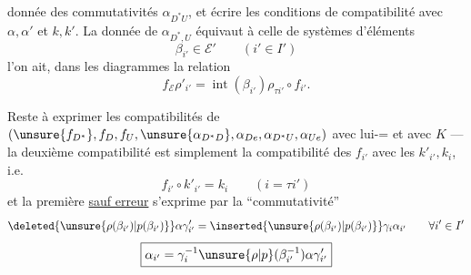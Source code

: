 
donnée des commutativités $\alpha_{D^*U}$, et écrire les conditions de compatibilité avec $\alpha,\alpha'$ et $k,k'$. La donnée de $\alpha_{D^*,U}$ équivaut à celle de systèmes d'éléments
\[
\boxed{\beta_{i'}\in\mathcal E'}\qquad(i'\in I')
\]
 l'on ait, dans les diagrammes
la relation
\[
f_{\mathcal E}\rho'_{i'}=\operatorname{int}(\beta_{i'})\rho_{\tau i'}\circ f_{i'}.
\]

Reste à exprimer les  compatibilités  de
$(\unsure{f_{D^*}},f_D,f_U,\unsure{\alpha_{D^*D}},\alpha_{De},\alpha_{D^*U},\alpha_{Ue})$ avec
lui-= et avec $K$ --- la deuxième compatibilité est simplement la compatibilité des $f_{i'}$ avec les $k'_{i'},k_i$, i.e.
\[
f_{i'}\circ k'_{i'}=k_i\qquad(i=\tau i')
\]
et la première \uline{sauf erreur} s'exprime par la ``commutativité''
\[
\deleted{\unsure{\rho(\beta_{i'})|p(\beta_{i'})}}\alpha\gamma'_{i'}
 =\inserted{\unsure{\rho(\beta_{i'})|p(\beta_{i'})}}\gamma_i\alpha_{i'}
 \qquad\forall i'\in I'
\]
\[
\boxed{\alpha_{i'}=\gamma_i^{-1}\unsure{\rho|p}(\beta_{i'}^{-1})\alpha\gamma'_{i'}}
\]


